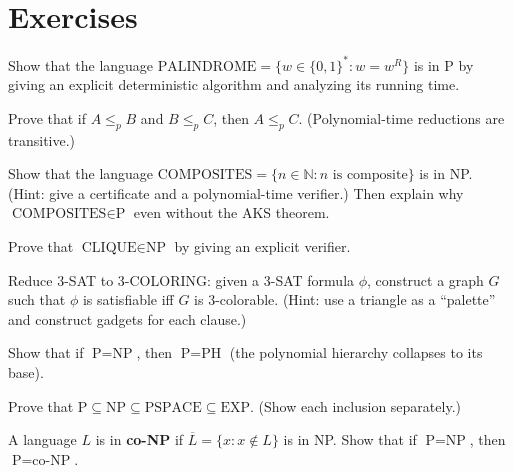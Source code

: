 \section{Exercises}

\begin{exercise}
Show that the language $\text{PALINDROME} = \{w \in \{0,1\}^* : w = w^R\}$ is in P by giving an explicit deterministic algorithm and analyzing its running time.
\end{exercise}

\begin{exercise}
Prove that if $A \leq_p B$ and $B \leq_p C$, then $A \leq_p C$. (Polynomial-time reductions are transitive.)
\end{exercise}

\begin{exercise}
Show that the language $\text{COMPOSITES} = \{n \in \mathbb{N} : n \text{ is composite}\}$ is in NP. (Hint: give a certificate and a polynomial-time verifier.) Then explain why $\text{COMPOSITES} \in \text{P}$ even without the AKS theorem.
\end{exercise}

\begin{exercise}
Prove that $\text{CLIQUE} \in \text{NP}$ by giving an explicit verifier.
\end{exercise}

\begin{exercise}
Reduce 3-SAT to 3-COLORING: given a 3-SAT formula $\phi$, construct a graph $G$ such that $\phi$ is satisfiable iff $G$ is 3-colorable. (Hint: use a triangle as a ``palette'' and construct gadgets for each clause.)
\end{exercise}

\begin{exercise}
Show that if $\text{P} = \text{NP}$, then $\text{P} = \text{PH}$ (the polynomial hierarchy collapses to its base).
\end{exercise}

\begin{exercise}
Prove that $\text{P} \subseteq \text{NP} \subseteq \text{PSPACE} \subseteq \text{EXP}$. (Show each inclusion separately.)
\end{exercise}

\begin{exercise}
A language $L$ is in \textbf{co-NP} if $\overline{L} = \{x : x \notin L\}$ is in NP. Show that if $\text{P} = \text{NP}$, then $\text{P} = \text{co-NP}$.
\end{exercise}

